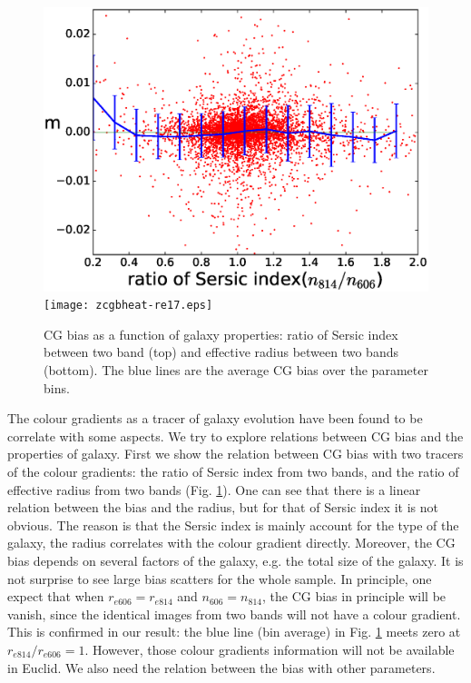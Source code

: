\documentclass[useAMS,usenatbib]{mnras}
\begin{document}
\begin{figure}
\includegraphics[width=\hsize]{zcgb-ne17.eps}
\texttt{[image: zcgbheat-re17.eps]}
\caption{CG bias as a function of galaxy properties: ratio of Sersic
  index between two band (top) and effective radius between two bands
  (bottom). The blue lines are the average CG bias over the parameter
  bins.}
\label{fig:cg2fitpar}
\end{figure}

The colour gradients as a tracer of galaxy evolution have been found
to be correlate with some aspects. We try to explore relations between
CG bias and the properties of galaxy. First we show the relation
between CG bias with two tracers of the colour gradients: the ratio of
Sersic index from two bands, and the ratio of effective radius from
two bands (Fig. \ref{fig:cg2fitpar}). One can see that there is a
linear relation between the bias and the radius, but for that of
Sersic index it is not obvious. The reason is that the Sersic index is
mainly account for the type of the galaxy, the radius correlates with
the colour gradient directly. Moreover, the CG bias depends on several
factors of the galaxy, e.g. the total size of the galaxy. It is not
surprise to see large bias scatters for the whole sample. In
principle, one expect that when $r_{e606}=r_{e814}$ and
$n_{606}=n_{814}$, the CG bias in principle will be vanish, since the
identical images from two bands will not have a colour gradient. This
is confirmed in our result: the blue line (bin average) in
Fig. \ref{fig:cg2fitpar} meets zero at $r_{e814}/r_{e606}=1$. However,
those colour gradients information will not be available in Euclid. We
also need the relation between the bias with other parameters.
\end{document}
